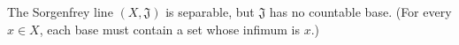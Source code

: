 The Sorgenfrey line $(X, \mathfrak{J})$ is separable, but $\mathfrak{J}$ has no countable base. (For every $x \in X$, each base must contain a set whose infimum is $x$.)
